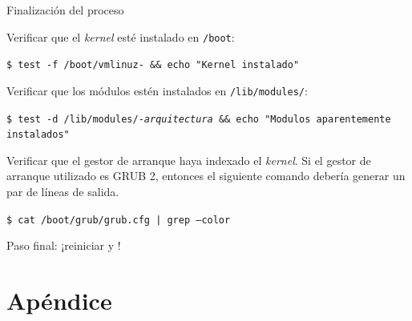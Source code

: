 \begin{frame}{Finalización del proceso}

Verificar que el \textit{kernel} esté instalado en \texttt{/boot}:

{ \tiny
  \begin{block}{}
    \texttt{\$ test -f /boot/vmlinuz-\PATCHEDKERNELVERSION\ \&\& echo "Kernel instalado"}
\end{block} }

Verificar que los módulos estén instalados en
\texttt{/lib/modules/\PATCHEDKERNELVERSION}:

{ \tiny
  \begin{block}{}
    \texttt{\$ test -d /lib/modules/\PATCHEDKERNELVERSION-\textit{arquitectura}
      \&\& echo "Modulos aparentemente instalados"}
\end{block} }

Verificar que el gestor de arranque haya indexado el \textit{kernel}. Si el
gestor de arranque utilizado es GRUB 2, entonces el siguiente comando
debería generar un par de líneas de salida.

  { \tiny
  \begin{block}{}
    \texttt{\$ cat /boot/grub/grub.cfg  | grep --color \KERNELBASEVERSION}
\end{block} }

Paso final: ¡\alert{reiniciar} y !
\end{frame}

\section{Apéndice}

